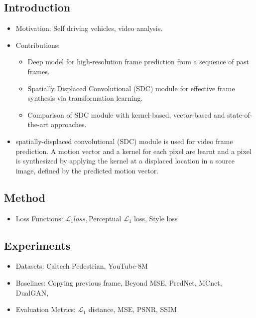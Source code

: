 \documentclass{article}
\begin{document}
    \subsection{Introduction}\label{subsec:SDC_Net_Video_prediction_using_spatially_displaced_convolution:introduction}
    \begin{itemize}
        \item Motivation: Self driving vehicles, video analysis.
        \item Contributions:
        \begin{itemize}
            \item Deep model for high-resolution frame prediction from a sequence of past frames.
            \item Spatially Displaced Convolutional (SDC) module for effective frame synthesis via transformation learning.
            \item Comparison of SDC module with kernel-based, vector-based and state-of-the-art approaches.
        \end{itemize}
        \item spatially-displaced convolutional (SDC) module is used for video frame prediction.
        A motion vector and a kernel for each pixel are learnt and a pixel is synthesized by applying the kernel at a displaced location in a source image, defined by the predicted motion vector.
    \end{itemize}

    \subsection{Method}\label{subsec:SDC_Net_Video_prediction_using_spatially_displaced_convolution:method}
    \begin{itemize}
        \item Loss Functions: $\mathcal{L}_{1} loss, $Perceptual $\mathcal{L}_1$ loss, Style loss
    \end{itemize}

    \subsection{Experiments}\label{subsec:SDC_Net_Video_prediction_using_spatially_displaced_convolution:experiments}
    \begin{itemize}
        \item Datasets: Caltech Pedestrian, YouTube-8M
        \item Baselines: Copying previous frame, Beyond MSE, PredNet, MCnet, DualGAN,
        \item Evaluation Metrics: $\mathcal{L}_1$ distance, MSE, PSNR, SSIM
    \end{itemize}
    \newpage
\end{document}
